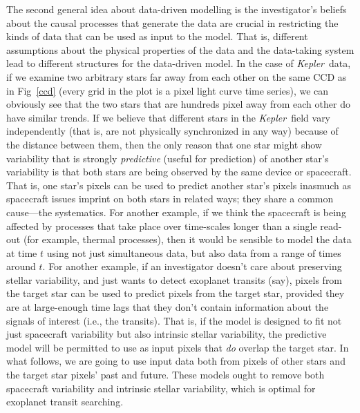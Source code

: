 \documentclass[12pt, preprint]{aastex}
\newcommand{\project}[1]{\textsl{#1}}
\newcommand{\Kepler}{\project{Kepler}}
\begin{document}
The second general idea about data-driven modelling is the investigator's beliefs
  about the causal processes that generate the data
  are crucial in restricting the kinds of data that can be used as input to the model.
That is, different assumptions about the physical properties of the data
  and the data-taking system
  lead to different structures for the data-driven model.
In the case of \Kepler\ data, 
  if we examine two arbitrary stars far away from each other 
  on the same CCD as in Fig~\ref{ccd} (every grid in the plot is a pixel light curve time series), 
  we can obviously see that the two stars that are hundreds pixel away from each other do have similar trends. 
  If we believe that different stars in the \Kepler\ field vary independently 
  (that is, are not physically synchronized in any way) because of the distance between them, 
  then the only reason that one star might show variability that is strongly \emph{predictive} (useful for prediction) of another star's variability
  is that both stars are being observed by the same device or spacecraft.
That is, one star's pixels can be used to predict another star's pixels
  inasmuch as spacecraft issues imprint on both stars in related ways;
  they share a common cause---the systematics.  
For another example, if we think the spacecraft is being affected by
  processes that take place over time-scales longer than a single read-out
  (for example, thermal processes),
  then it would be sensible to model the data at time $t$ using not just simultaneous data, but also data from a range of times around $t$.
For another example, if an investigator doesn't care about preserving stellar variability,
  and just wants to detect exoplanet transits (say),
  pixels from the target star can be used to predict pixels from the target star,
  provided they are at large-enough time lags that they don't contain information about
  the signals of interest (i.e., the transits).
That is, if the model is designed to fit not just spacecraft variability
  but also intrinsic stellar variability,
  the predictive model will be permitted to use as input pixels that \emph{do} overlap the 
  target star.
In what follows, we are going to use input data both from pixels of other stars and the  
target star pixels' past and future.
These models ought to remove both spacecraft variability and intrinsic stellar variability, 
which is optimal for exoplanet transit searching.
\end{document}
